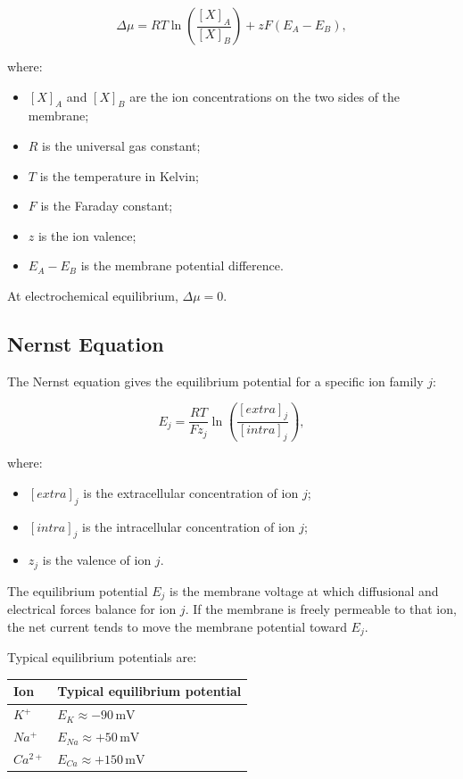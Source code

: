 \[
\Delta \mu =
RT \ln \left( \frac{[X]_A}{[X]_B} \right)
+
zF(E_A - E_B),
\]

where:

\begin{itemize}[noitemsep]
    \item $[X]_A$ and $[X]_B$ are the ion concentrations on the two sides of the membrane;
    \item $R$ is the universal gas constant;
    \item $T$ is the temperature in Kelvin;
    \item $F$ is the Faraday constant;
    \item $z$ is the ion valence;
    \item $E_A - E_B$ is the membrane potential difference.
\end{itemize}

At electrochemical equilibrium, $\Delta \mu = 0$.

\subsection{Nernst Equation}

The Nernst equation gives the equilibrium potential for a specific ion family $j$:

\[
E_j =
\frac{RT}{Fz_j}
\ln
\left(
\frac{[extra]_j}{[intra]_j}
\right),
\]

where:

\begin{itemize}[noitemsep]
    \item $[extra]_j$ is the extracellular concentration of ion $j$;
    \item $[intra]_j$ is the intracellular concentration of ion $j$;
    \item $z_j$ is the valence of ion $j$.
\end{itemize}

The equilibrium potential $E_j$ is the membrane voltage at which diffusional and electrical forces balance for ion $j$. If the membrane is freely permeable to that ion, the net current tends to move the membrane potential toward $E_j$.

Typical equilibrium potentials are:

\begin{center}
\begin{tabular}{ll}
\toprule
\textbf{Ion} & \textbf{Typical equilibrium potential} \\
\midrule
$K^+$ & $E_K \approx -90\,\text{mV}$ \\
$Na^+$ & $E_{Na} \approx +50\,\text{mV}$ \\
$Ca^{2+}$ & $E_{Ca} \approx +150\,\text{mV}$ \\
\bottomrule
\end{tabular}
\end{center}

